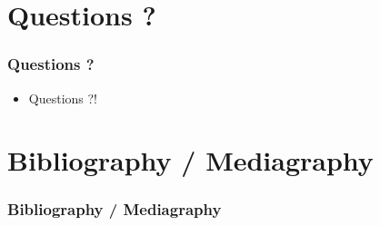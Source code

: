 \documentclass{beamer}
\begin{document}
\def\sectionPartQuestions{Questions ?}
\section{\sectionPartQuestions}
\begin{frame}
	\frametitle{\sectionPartQuestions}
	\begin{itemize}
		\item Questions ?!
	\end{itemize}
\end{frame}

\def\sectionPartBibliographie{Bibliography / Mediagraphy}
\section{\sectionPartBibliographie}
\begin{frame}
	\frametitle{\sectionPartBibliographie}
	\nocite{*}
	
	
\end{frame}
\end{document}
